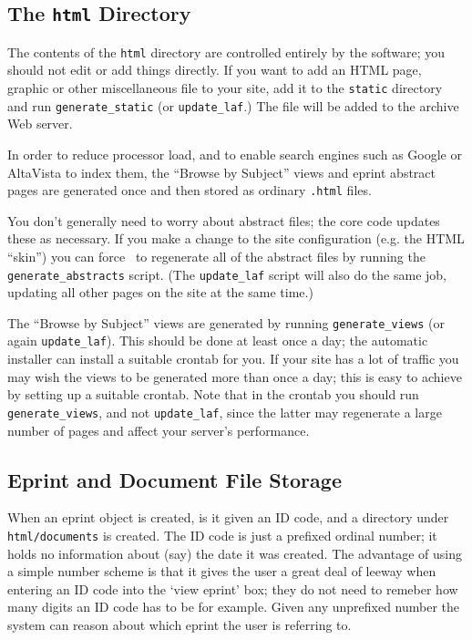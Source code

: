 \subsection{The {\tt html} Directory}
\label{eprint_storage}

The contents of the {\tt html} directory are controlled entirely by the software; you should not edit or add things directly. If you want to add an HTML page, graphic or other miscellaneous file to your site, add it to the {\tt static} directory and run {\tt generate\_static} (or {\tt update\_laf}.) The file will be added to the archive Web server.

In order to reduce processor load, and to enable search engines such as Google or AltaVista to index them, the ``Browse by Subject'' views and eprint abstract pages are generated once and then stored as ordinary {\tt .html} files.

You don't generally need to worry about abstract files; the core code updates these as necessary. If you make a change to the site configuration (e.g. the HTML ``skin'') you can force \eprints\ to regenerate all of the abstract files by running the {\tt generate\_abstracts} script. (The {\tt update\_laf} script will also do the same job, updating all other pages on the site at the same time.)

The ``Browse by Subject'' views are generated by running {\tt generate\_views} (or again {\tt update\_laf}). This should be done at least once a day; the automatic installer can install a suitable crontab for you. If your site has a lot of traffic you may wish the views to be generated more than once a day; this is easy to achieve by setting up a suitable crontab. Note that in the crontab you should run {\tt generate\_views}, and not {\tt update\_laf}, since the latter may regenerate a large number of pages and affect your server's performance.

\subsection{Eprint and Document File Storage}

When an eprint object is created, is it given an ID code, and a directory under {\tt html/documents} is created. The ID code is just a prefixed ordinal number; it holds no information about (say) the date it was created. The advantage of using a simple number scheme is that it gives the user a great deal of leeway when entering an ID code into the `view eprint' box; they do not need to remeber how many digits an ID code has to be for example. Given any unprefixed number the system can reason about which eprint the user is referring to.

